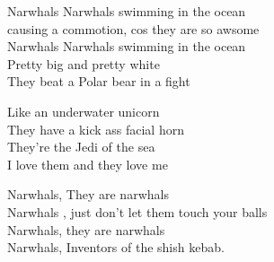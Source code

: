 \vspace{10pt}
Narwhals Narwhals swimming in the ocean\\
causing a commotion, cos they are so awsome\\
Narwhals Narwhals swimming in the ocean\\
Pretty big and pretty white \\
They beat a Polar bear in a fight\par
\vspace{10pt}
Like an underwater unicorn\\
They have a kick ass facial horn\\
They're the Jedi of the sea\\
I love them and they love me\par
\vspace{10pt}
Narwhals, They are narwhals\\
Narwhals , just don't let them touch your balls\\
Narwhals, they are narwhals\\
Narwhals, Inventors of the shish kebab.
